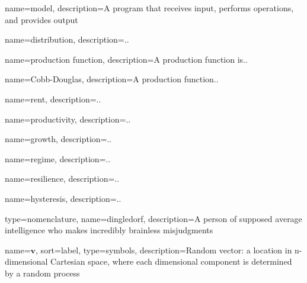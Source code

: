 {
name=model,
description={A program that receives input, performs operations, 
						and provides output}
}

{
name=distribution,
description={..}
}

{
name=production function,
description={A production function is..}
}

{
name=Cobb-Douglas,
description={A production function..}
}

{
name=rent,
description={..}
}

{
name=productivity,
description={..}
}

{
name=growth,
description={..}
}

{
name=regime,
description={..}
}

{
name=resilience,
description={..}
}

{
name=hysteresis,
description={..}
}


{
type=nomenclature,
name=dingledorf,
description={A person of supposed average intelligence who makes incredibly brainless misjudgments}
}



{
name={$\mathbf{v}$},
sort={label},
type=symbols,
description={Random vector: a location in n-dimensional Cartesian space, where each dimensional component is determined by a random process}
}